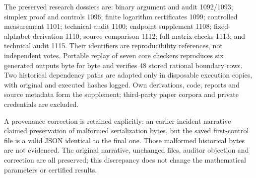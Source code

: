 \documentclass[11pt]{article}
\theoremstyle{remark}\newtheorem{remark}[theorem]{Remark}
\begin{document}
The preserved research dossiers are: binary argument and audit 1092/1093; simplex proof and controls 1096; finite logarithm certificates 1099; controlled measurement 1101; technical audit 1100; endpoint supplement 1108; fixed-alphabet derivation 1110; source comparison 1112; full-matrix checks 1113; and technical audit 1115. Their identifiers are reproducibility references, not independent votes. Portable replay of seven core checkers reproduces six generated outputs byte for byte and verifies 48 stored rational boundary rows. Two historical dependency paths are adapted only in disposable execution copies, with original and executed hashes logged. Own derivations, code, reports and source metadata form the supplement; third-party paper corpora and private credentials are excluded.

A provenance correction is retained explicitly: an earlier incident narrative claimed preservation of malformed serialization bytes, but the saved first-control file is a valid JSON identical to the final one. Those malformed historical bytes are not evidenced. The original narrative, unchanged files, auditor objection and correction are all preserved; this discrepancy does not change the mathematical parameters or certified results.
\end{document}
